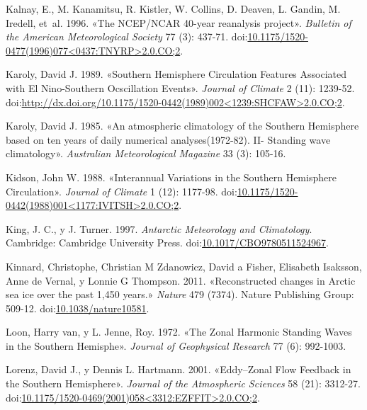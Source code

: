 \documentclass[spanish,a4paper,12p]{book}
\begin{document}
\hypertarget{ref-Kalnay1996}{}
Kalnay, E., M. Kanamitsu, R. Kistler, W. Collins, D. Deaven, L. Gandin,
M. Iredell, et~al. 1996. «The NCEP/NCAR 40-year reanalysis project».
\emph{Bulletin of the American Meteorological Society} 77 (3): 437-71.
doi:\href{https://doi.org/10.1175/1520-0477(1996)077\%3C0437:TNYRP\%3E2.0.CO;2}{10.1175/1520-0477(1996)077\textless{}0437:TNYRP\textgreater{}2.0.CO;2}.

\hypertarget{ref-Karoly1989}{}
Karoly, David J. 1989. «Southern Hemisphere Circulation Features
Associated with El Nino-Southern Ocscillation Events». \emph{Journal of
Climate} 2 (11): 1239-52.
doi:\href{https://doi.org/http://dx.doi.org/10.1175/1520-0442(1989)002\%3C1239:SHCFAW\%3E2.0.CO;2}{http://dx.doi.org/10.1175/1520-0442(1989)002\textless{}1239:SHCFAW\textgreater{}2.0.CO;2}.

\hypertarget{ref-Karoly1985}{}
Karoly, David J. 1985. «An atmospheric climatology of the Southern
Hemisphere based on ten years of daily numerical analyses(1972-82). II-
Standing wave climatology». \emph{Australian Meteorological Magazine} 33
(3): 105-16.

\hypertarget{ref-Kidson1988}{}
Kidson, John W. 1988. «Interannual Variations in the Southern Hemisphere
Circulation». \emph{Journal of Climate} 1 (12): 1177-98.
doi:\href{https://doi.org/10.1175/1520-0442(1988)001\%3C1177:IVITSH\%3E2.0.CO;2}{10.1175/1520-0442(1988)001\textless{}1177:IVITSH\textgreater{}2.0.CO;2}.

\hypertarget{ref-King1997}{}
King, J. C., y J. Turner. 1997. \emph{Antarctic Meteorology and
Climatology}. Cambridge: Cambridge University Press.
doi:\href{https://doi.org/10.1017/CBO9780511524967}{10.1017/CBO9780511524967}.

\hypertarget{ref-Kinnard2011}{}
Kinnard, Christophe, Christian M Zdanowicz, David a Fisher, Elisabeth
Isaksson, Anne de Vernal, y Lonnie G Thompson. 2011. «Reconstructed
changes in Arctic sea ice over the past 1,450 years.» \emph{Nature} 479
(7374). Nature Publishing Group: 509-12.
doi:\href{https://doi.org/10.1038/nature10581}{10.1038/nature10581}.

\hypertarget{ref-Loon1972}{}
Loon, Harry van, y L. Jenne, Roy. 1972. «The Zonal Harmonic Standing
Waves in the Southern Hemisphe». \emph{Journal of Geophysical Research}
77 (6): 992-1003.

\hypertarget{ref-Lorenz2001}{}
Lorenz, David J., y Dennis L. Hartmann. 2001. «Eddy--Zonal Flow Feedback
in the Southern Hemisphere». \emph{Journal of the Atmospheric Sciences}
58 (21): 3312-27.
doi:\href{https://doi.org/10.1175/1520-0469(2001)058\%3C3312:EZFFIT\%3E2.0.CO;2}{10.1175/1520-0469(2001)058\textless{}3312:EZFFIT\textgreater{}2.0.CO;2}.
\end{document}
